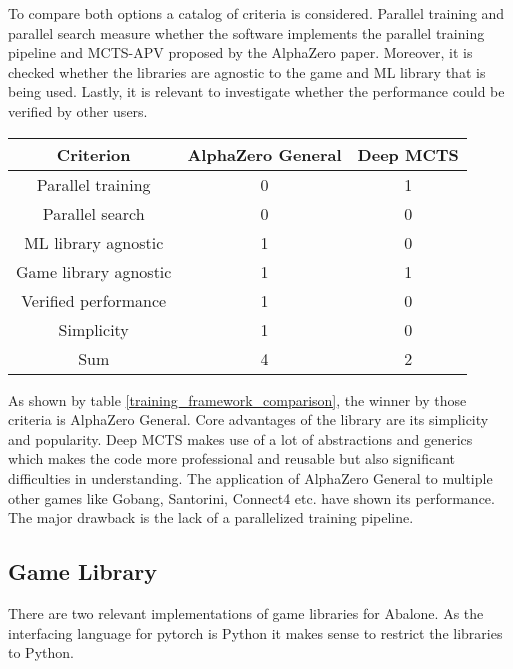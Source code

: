 To compare both options a catalog of criteria is considered. Parallel training and parallel search measure whether the software implements the parallel training pipeline and MCTS-APV proposed by the AlphaZero paper. Moreover, it is checked whether the libraries are agnostic to the game and ML library that is being used. Lastly, it is relevant to investigate whether the performance could be verified by other users.

\begin{table*}
    \begin{center}
        \begin{tabular}{ c|c|c }
            Criterion             & AlphaZero General & Deep MCTS \\
            \hline
            \hline
            Parallel training     & 0                 & 1         \\
            Parallel search       & 0                 & 0         \\
            ML library agnostic   & 1                 & 0         \\
            Game library agnostic & 1                 & 1         \\
            Verified performance  & 1                 & 0         \\
            Simplicity            & 1                 & 0         \\
            \hline
            \hline
            Sum                   & 4                 & 2         \\
        \end{tabular}
    \end{center}
    \caption{A comparison of existing AlphaZero frameworks}\label{training_framework_comparison}
\end{table*}

As shown by table \ref{training_framework_comparison}, the winner by those criteria is AlphaZero General. Core advantages of the library are its simplicity and popularity. Deep MCTS makes use of a lot of abstractions and generics which makes the code more professional and reusable but also significant difficulties in understanding. The application of AlphaZero General to multiple other games like Gobang, Santorini, Connect4 etc. have shown its performance. The major drawback is the lack of a parallelized training pipeline.

\subsection{Game Library}
There are two relevant implementations of game libraries for Abalone. As the interfacing language for pytorch is Python it makes sense to restrict the libraries to Python.

